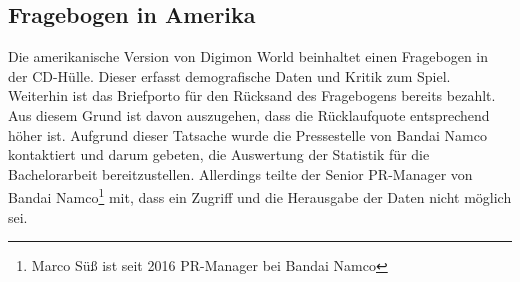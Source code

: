 \subsection{Fragebogen in Amerika}
Die amerikanische Version von Digimon World beinhaltet einen Fragebogen in der CD-Hülle.
Dieser erfasst demografische Daten und Kritik zum Spiel.
Weiterhin ist das Briefporto für den Rücksand des Fragebogens bereits bezahlt.
Aus diesem Grund ist davon auszugehen, dass die Rücklaufquote entsprechend höher ist.
Aufgrund dieser Tatsache wurde die Pressestelle von Bandai Namco kontaktiert und darum gebeten, die Auswertung der Statistik für die Bachelorarbeit bereitzustellen.
Allerdings teilte der Senior PR-Manager von Bandai Namco\footnote{Marco Süß ist seit 2016 PR-Manager bei Bandai Namco\cite{marcosuess}} mit, dass ein Zugriff und die Herausgabe der Daten nicht möglich sei.
